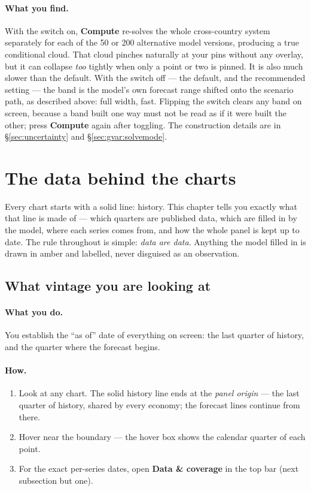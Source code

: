 \documentclass[11pt]{article}
\theoremstyle{definition}
\theoremstyle{remark}
\begin{document}
\paragraph{What you find.} With the switch on, \textbf{Compute} re-solves the whole
cross-country system separately for each of the 50 or 200 alternative model versions,
producing a true conditional cloud. That cloud pinches naturally at your pins without
any overlay, but it can collapse \emph{too} tightly when only a point or two is pinned.
It is also much slower than the default. With the switch off --- the default, and the
recommended setting --- the band is the model's own forecast range shifted onto the
scenario path, as described above: full width, fast. Flipping the switch clears any
band on screen, because a band built one way must not be read as if it were built the
other; press \textbf{Compute} again after toggling. The construction details are in
\S\ref{sec:uncertainty} and \S\ref{sec:gvar:solvemode}.

\section{The data behind the charts}\label{sec:use-data}

Every chart starts with a solid line: history. This chapter tells you exactly what
that line is made of --- which quarters are published data, which are filled in by
the model, where each series comes from, and how the whole panel is kept up to date.
The rule throughout is simple: \emph{data are data}. Anything the model filled in is
drawn in amber and labelled, never disguised as an observation.

\subsection{What vintage you are looking at}

\paragraph{What you do.}
You establish the ``as of'' date of everything on screen: the last quarter of
history, and the quarter where the forecast begins.

\paragraph{How.}
\begin{enumerate}
  \item Look at any chart. The solid history line ends at the \emph{panel
    origin} --- the last quarter of history, shared by every economy; the
    forecast lines continue from there.
  \item Hover near the boundary --- the hover box shows the calendar quarter of
    each point.
  \item For the exact per-series dates, open \textbf{Data \& coverage}
    in the top bar (next subsection but one).
\end{enumerate}
\end{document}
